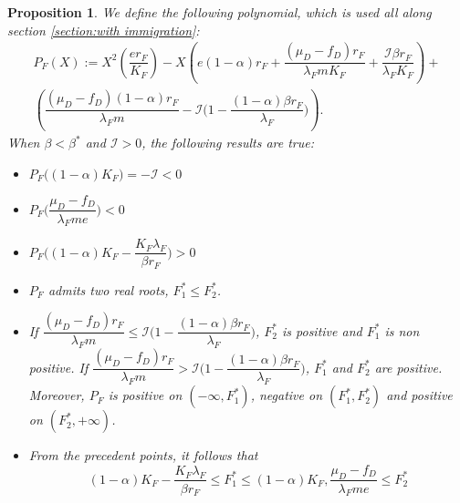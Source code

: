 \documentclass{article}
\newcommand{\lfw}{\lambda_{F}}
\newcommand{\lfw}{\lambda_{F}}
\newcommand{\cI}{\mathcal{I}}
\newtheorem{prop}{Proposition}
\begin{document}
\begin{prop} \label{propPF}
We define the following polynomial, which is used all along section \ref{section:with immigration}:
\begin{multline}
P_F(X) := X^2 \left(\dfrac{er_F}{K_F} \right) - X \left(e(1-\alpha)r_F + \dfrac{(\mu_D - f_D) r_F}{\lfw m K_F} + \dfrac{\cI \beta r_F}{\lfw K_F} \right) + \\ \left(\dfrac{(\mu_D - f_D)(1-\alpha) r_F}{\lfw m} - \cI\Big(1 - \dfrac{(1-\alpha)\beta r_F}{\lfw} \Big) \right).
\label{polynome-Feq}
\end{multline} When $\beta < \beta^*$ and $\cI > 0$, the following results are true:

\begin{itemize}
\item $P_F\Big((1-\alpha)K_F\Big) = -\cI < 0$
\item $P_F\Big(\dfrac{\mu_D - f_D}{\lfw m e}\Big) < 0$
\item $P_F\Big((1-\alpha)K_F - \dfrac{K_F \lfw}{\beta r_F}\Big) > 0$
\item $P_F$ admits two real roots, $F_1^* \leq F_2^*$. 
\item If $\dfrac{(\mu_D - f_D) r_F}{\lfw m } \leq \cI\Big(1 - \dfrac{(1-\alpha)\beta r_F}{\lfw} \Big)$,  $F_2^*$ is positive and $F_1^*$ is non positive. If $\dfrac{(\mu_D - f_D) r_F}{\lfw m } > \cI\Big(1 - \dfrac{(1-\alpha)\beta r_F}{\lfw} \Big)$, $F^*_1$ and $F^*_2$ are positive. Moreover, $P_F$ is positive on $(-\infty, F_1^*)$, negative on $(F^*_1, F^*_2)$ and positive on $(F^*_2, +\infty)$.
\item From the precedent points, it follows that $$(1-\alpha)K_F - \dfrac{K_F \lfw}{\beta r_F} \leq F^*_1 \leq (1-\alpha)K_F, \dfrac{\mu_D - f_D}{\lfw m e} \leq F_2^* $$
\end{itemize}

\end{prop}
\end{document}
